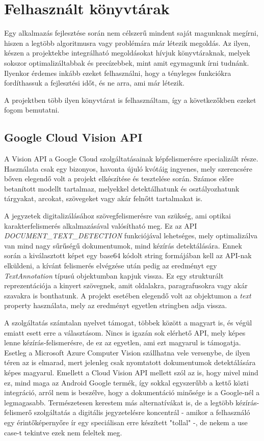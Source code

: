 \chapter{Felhasznált könyvtárak}

Egy alkalmazás fejlesztése során nem célszerű mindent saját magunknak megírni, hiszen a legtöbb algoritmusra vagy problémára már létezik megoldás. Az ilyen, készen a projektekbe integrálható megoldásokat hívjuk könyvtáraknak, melyek sokszor optimalizáltabbak és precízebbek, mint amit egymagunk írni tudnánk. Ilyenkor érdemes inkább ezeket felhasználni, hogy a tényleges funkciókra fordíthassuk a fejlesztési időt, és ne arra, ami már létezik.

A projektben több ilyen könyvtárat is felhasználtam, így a következőkben ezeket fogom bemutatni.

\section{Google Cloud Vision API}

A Vision API a Google Cloud szolgáltatásainak képfelismerésre specializált része. Használata csak egy bizonyos, havonta újuló kvótáig ingyenes, mely szerencsére bőven elegendő volt a projekt elkészítése és tesztelése során. Számos előre betanított modellt tartalmaz, melyekkel detektálhatunk és osztályozhatunk tárgyakat, arcokat, szövegeket vagy akár felnőtt tartalmakat is. \cite{Vision}

A jegyzetek digitalizálásához szövegfelismerésre van szükség, ami optikai karakterfelismerés alkalmazásával valósítható meg. Ez az API \emph{DOCUMENT\_TEXT\_DETECTION} funkciójával lehetséges, mely optimalizálva van mind nagy sűrűségű dokumentumok, mind kézírás detektálására. Ennek során a kiválasztott képet egy base64 kódolt string formájában kell az API-nak elküldeni, a kívánt felismerés elvégzése után pedig az eredményt egy \emph{TextAnnotation} típusú objektumban kapjuk vissza. Ez egy strukturált reprezentációja a kinyert szövegnek, amit oldalakra, paragrafusokra vagy akár szavakra is bonthatunk. A projekt esetében elegendő volt az objektumon a \emph{text} property használata, mely az eredményt egyetlen stringben adja vissza.

A szolgáltatás számtalan nyelvet támogat, többek között a magyart is, és végül emiatt esett erre a választásom. Nincs is igazán sok elérhető API, mely képes lenne kézírás-felismerésre, de ez az egyetlen, ami ezt magyarul is támogatja. Esetleg a Microsoft Azure Computer Vision szállhatna vele versenybe, de ilyen téren az is elmarad, mert jelenleg csak nyomtatott dokumentumok detektálására képes magyarul. Emellett a Cloud Vision API mellett szól az is, hogy mivel mind ez, mind maga az Android Google termék, így sokkal egyszerűbb a kettő közti integráció, arról nem is beszélve, hogy a dokumentáció minősége is a Google-nél a legmagasabb. Természetesen kerestem más alternatívákat is, de a legtöbb kézírás-felismerő szolgáltatás a digitális jegyzetelésre koncentrál - amikor a felhasználó egy érintőképernyőre ír egy speciálisan erre készített "tollal" -, de nekem a use case-t tekintve ezek nem feleltek meg.


